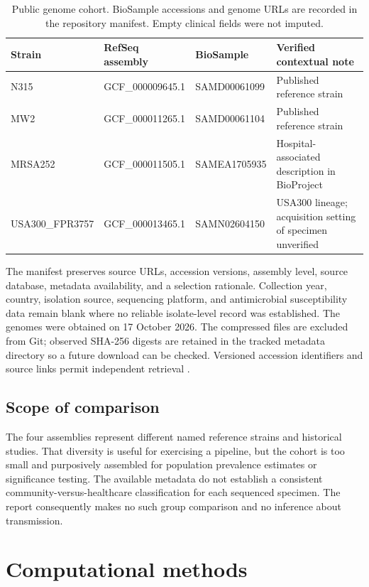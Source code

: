 \documentclass[11pt,a4paper]{article}
\begin{document}
\begin{table}[htbp]
\centering\small
\caption{Public genome cohort. BioSample accessions and genome URLs are recorded in the repository manifest. Empty clinical fields were not imputed.}
\begin{tabular}{@{}lllp{45mm}@{}}\toprule
Strain & RefSeq assembly & BioSample & Verified contextual note\\\midrule
N315 & GCF\_000009645.1 & SAMD00061099 & Published reference strain\\
MW2 & GCF\_000011265.1 & SAMD00061104 & Published reference strain\\
MRSA252 & GCF\_000011505.1 & SAMEA1705935 & Hospital-associated description in BioProject\\
USA300\_FPR3757 & GCF\_000013465.1 & SAMN02604150 & USA300 lineage; acquisition setting of specimen unverified\\\bottomrule
\end{tabular}
\label{tab:cohort}
\end{table}

The manifest preserves source URLs, accession versions, assembly level, source database, metadata availability, and a selection rationale. Collection year, country, isolation source, sequencing platform, and antimicrobial susceptibility data remain blank where no reliable isolate-level record was established. The genomes were obtained on 17 October 2026. The compressed files are excluded from Git; observed SHA-256 digests are retained in the tracked metadata directory so a future download can be checked. Versioned accession identifiers and source links permit independent retrieval \cite{NCBI_Datasets}.

\subsection{Scope of comparison}
The four assemblies represent different named reference strains and historical studies. That diversity is useful for exercising a pipeline, but the cohort is too small and purposively assembled for population prevalence estimates or significance testing. The available metadata do not establish a consistent community-versus-healthcare classification for each sequenced specimen. The report consequently makes no such group comparison and no inference about transmission.

\section{Computational methods}
\end{document}
